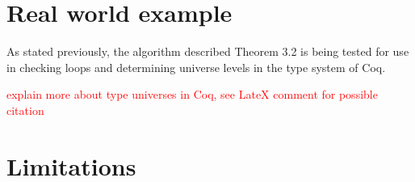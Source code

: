 \section{Real world example}

As stated previously, the algorithm described Theorem 3.2 is being
tested for use in checking loops and determining universe levels in the
type system of Coq.

\textcolor{red}{explain more about type universes in Coq, see LateX comment for possible citation}

\section{Limitations}
\label{sec:limitations}

